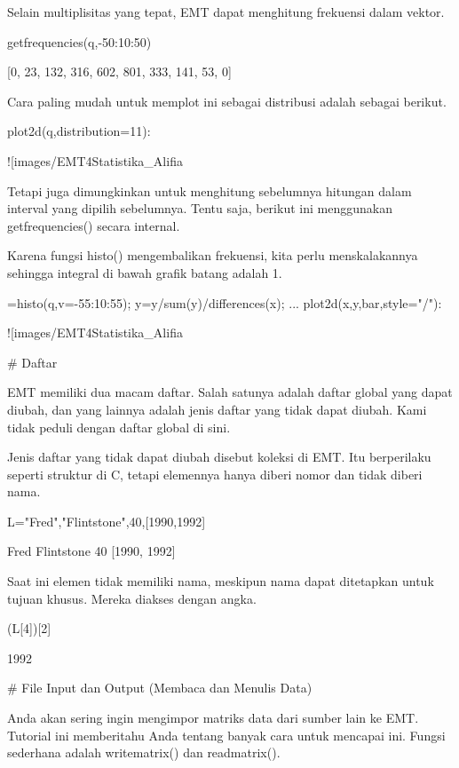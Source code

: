 \documentclass{article}
\begin{document}
Selain multiplisitas yang tepat, EMT dapat menghitung frekuensi dalam
vektor.


\> getfrequencies(q,-50:10:50)


    [0,  23,  132,  316,  602,  801,  333,  141,  53,  0]

Cara paling mudah untuk memplot ini sebagai distribusi adalah sebagai
berikut.


\>plot2d(q,distribution=11):


![images/EMT4Statistika_Alifia%

Tetapi juga dimungkinkan untuk menghitung sebelumnya hitungan dalam
interval yang dipilih sebelumnya. Tentu saja, berikut ini menggunakan
getfrequencies() secara internal.


Karena fungsi histo() mengembalikan frekuensi, kita perlu
menskalakannya sehingga integral di bawah grafik batang adalah 1.


=histo(q,v=-55:10:55); y=y/sum(y)/differences(x); ...  
\>   plot2d(x,y,\>bar,style="/"):


![images/EMT4Statistika_Alifia%

# Daftar

EMT memiliki dua macam daftar. Salah satunya adalah daftar global yang
dapat diubah, dan yang lainnya adalah jenis daftar yang tidak dapat
diubah. Kami tidak peduli dengan daftar global di sini.


Jenis daftar yang tidak dapat diubah disebut koleksi di EMT. Itu
berperilaku seperti struktur di C, tetapi elemennya hanya diberi nomor
dan tidak diberi nama.


\>L={{"Fred","Flintstone",40,[1990,1992]}}


    Fred
    Flintstone
    40
    [1990,  1992]

Saat ini elemen tidak memiliki nama, meskipun nama dapat ditetapkan
untuk tujuan khusus. Mereka diakses dengan angka.


\>(L[4])[2]


    1992

# File Input dan Output (Membaca dan Menulis Data)

Anda akan sering ingin mengimpor matriks data dari sumber lain ke EMT.
Tutorial ini memberitahu Anda tentang banyak cara untuk mencapai ini.
Fungsi sederhana adalah writematrix() dan readmatrix().
\end{document}
